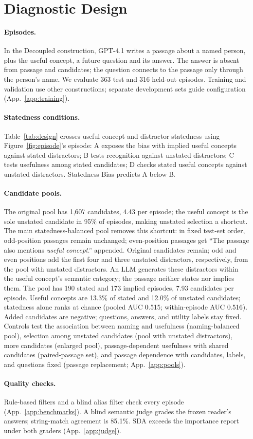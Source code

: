 \section{Diagnostic Design}\label{sec:design}

\paragraph{Episodes.}
In the Decoupled construction, GPT-4.1 writes a passage about a named person, plus the useful concept, a future question and its answer. The answer is absent from passage and candidates; the question connects to the passage only through the person's name. We evaluate 363 test and 316 held-out episodes. Training and validation use other constructions; separate development sets guide configuration (App.~\ref{app:training}).

\paragraph{Statedness conditions.}
Table~\ref{tab:design} crosses useful-concept and distractor statedness using Figure~\ref{fig:episode}'s episode: A exposes the bias with implied useful concepts against stated distractors; B tests recognition against unstated distractors; C tests usefulness among stated candidates; D checks stated useful concepts against unstated distractors. Statedness Bias predicts A below B.


\paragraph{Candidate pools.}
The original pool has 1,607 candidates, 4.43 per episode; the useful concept is the sole unstated candidate in 95\% of episodes, making unstated selection a shortcut. The main statedness-balanced pool removes this shortcut: in fixed test-set order, odd-position passages remain unchanged; even-position passages get ``The passage also mentions \emph{useful concept}.'' appended. Original candidates remain; odd and even positions add the first four and three unstated distractors, respectively, from the pool with unstated distractors. An LLM generates these distractors within the useful concept's semantic category; the passage neither states nor implies them. The pool has 190 stated and 173 implied episodes, 7.93 candidates per episode. Useful concepts are 13.3\% of stated and 12.0\% of unstated candidates; statedness alone ranks at chance (pooled AUC 0.515; within-episode AUC 0.516). Added candidates are negative; questions, answers, and utility labels stay fixed. Controls test the association between naming and usefulness (naming-balanced pool), selection among unstated candidates (pool with unstated distractors), more candidates (enlarged pool), passage-dependent usefulness with shared candidates (paired-passage set), and passage dependence with candidates, labels, and questions fixed (passage replacement; App.~\ref{app:pools}).

\paragraph{Quality checks.}
Rule-based filters and a blind alias filter check every episode (App.~\ref{app:benchmarks}). A blind semantic judge grades the frozen reader's answers; string-match agreement is 85.1\%. SDA exceeds the importance report under both graders (App.~\ref{app:judge}).
